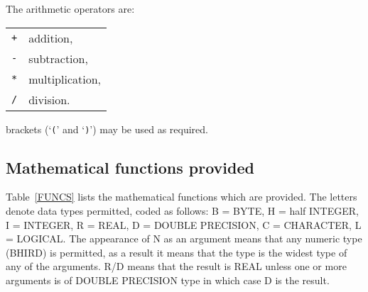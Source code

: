 \documentclass[11pt,twoside]{starlink}
\begin{document}
The arithmetic operators are:

\begin{tabular}{ll}
\texttt{+}  & addition,        \\
\texttt{-}  & subtraction,     \\
\texttt{*}  & multiplication,  \\
\texttt{/}  & division.        \\
\end{tabular}

brackets (`\texttt{(}' and `\texttt{)}') may be used as required.


\subsection{Mathematical functions provided}

Table~\ref{FUNCS} lists the mathematical functions which are provided.
The letters denote data types permitted, coded as follows: B = BYTE,
H = half INTEGER, I = INTEGER, R = REAL, D = DOUBLE PRECISION, C =
CHARACTER, L = LOGICAL. The appearance of N as an argument means that
any numeric type (BHIRD) is permitted, as a result it means that the
type is the widest type of any of the arguments.  R/D means that the
result is REAL unless one or more arguments is of DOUBLE PRECISION
type in which case D is the result.
\end{document}
